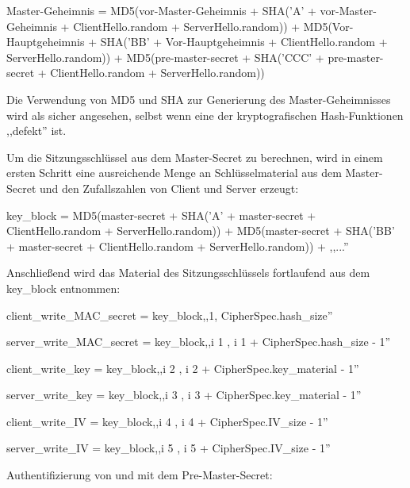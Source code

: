 \documentclass[a4paper]{article}
\begin{document}
\begin{multicols}{3}
\begin{itemize*}
\begin{itemize*}
                  \item Master-Geheimnis = MD5(vor-Master-Geheimnis + SHA('A' + vor-Master-Geheimnis + ClientHello.random + ServerHello.random)) + MD5(Vor-Hauptgeheimnis + SHA('BB' + Vor-Hauptgeheimnis + ClientHello.random + ServerHello.random)) + MD5(pre-master-secret + SHA('CCC' + pre-master-secret + ClientHello.random + ServerHello.random))
            \end{itemize*}
            \item Die Verwendung von MD5 und SHA zur Generierung des Master-Geheimnisses wird als sicher angesehen, selbst wenn eine der kryptografischen Hash-Funktionen ,,defekt'' ist.
            \item Um die Sitzungsschlüssel aus dem Master-Secret zu berechnen, wird in einem ersten Schritt eine ausreichende Menge an Schlüsselmaterial aus dem Master-Secret und den Zufallszahlen von Client und Server erzeugt:
            \begin{itemize*}
                  \item key\_block = MD5(master-secret + SHA('A' + master-secret + ClientHello.random + ServerHello.random)) + MD5(master-secret + SHA('BB' + master-secret + ClientHello.random + ServerHello.random)) + ,,...''
            \end{itemize*}
            \item Anschließend wird das Material des Sitzungsschlüssels fortlaufend aus dem key\_block entnommen:
            \begin{itemize*}
                  \item client\_write\_MAC\_secret = key\_block,,1, CipherSpec.hash\_size''
                  \item server\_write\_MAC\_secret = key\_block,,i 1 , i 1 + CipherSpec.hash\_size - 1''
                  \item client\_write\_key = key\_block,,i 2 , i 2 + CipherSpec.key\_material - 1''
                  \item server\_write\_key = key\_block,,i 3 , i 3 + CipherSpec.key\_material - 1''
                  \item client\_write\_IV = key\_block,,i 4 , i 4 + CipherSpec.IV\_size - 1''
                  \item server\_write\_IV = key\_block,,i 5 , i 5 + CipherSpec.IV\_size - 1''
            \end{itemize*}
            \item Authentifizierung von und mit dem Pre-Master-Secret:
            \begin{itemize*}

\end{itemize*}
\end{itemize*}
\end{multicols}
\end{document}

